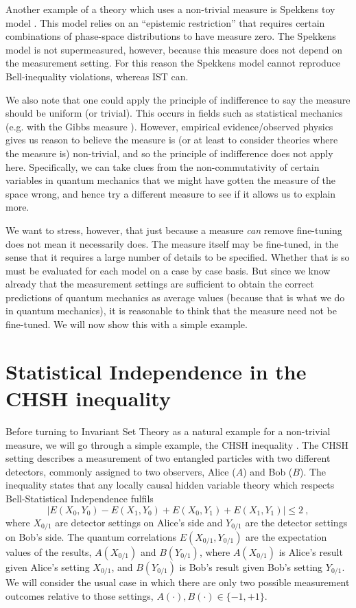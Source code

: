 \documentclass{article}
\begin{document}
Another example of a theory which uses a non-trivial measure is Spekkens toy model \mbox{\cite{Spekkens2007Evidence}}. This model relies on an ``epistemic restriction'' that requires certain combinations of phase-space distributions to have measure zero. The Spekkens model is not supermeasured, however, because this measure does not depend on the measurement setting. For this reason the Spekkens model cannot reproduce Bell-inequality violations, whereas {\sc IST} can.

We also note that one could apply the principle of indifference to say the measure should be uniform (or trivial). This occurs in fields such as statistical mechanics (e.g. with the Gibbs measure \mbox{\cite{georgii2011gibbs}}). However, empirical evidence/observed physics gives us reason to believe the measure is (or at least to consider theories where the measure is) non-trivial, and so the principle of indifference does not apply here. Specifically, we can take clues from the non-commutativity of certain variables in quantum mechanics that we might have gotten the measure of the space wrong, and hence try a different measure to see if it allows us to explain more.

We want to stress, however, that just because a measure \emph{can} remove fine-tuning does not mean it necessarily does. The measure itself may be fine-tuned, in the sense that it requires a large number of details to be specified. Whether that is so must be evaluated for each model on a case by case basis. But since we know already that the measurement settings are sufficient to obtain the correct predictions of quantum mechanics as average values (because that is what we do in quantum mechanics), it is reasonable to think that the measure need not be fine-tuned. We will now show this with a simple example.


\section{Statistical Independence in the CHSH inequality}
\label{CHSH}

Before turning to Invariant Set Theory as a natural example for a non-trivial measure, we will go through a simple example, the {\sc CHSH} inequality \cite{Clauser1969CHSH}.
The {\sc CHSH} setting describes a measurement of two entangled particles with two different detectors, commonly assigned to two observers, Alice ($A$) and Bob ($B$). The inequality states that any locally causal hidden variable theory which respects Bell-Statistical Independence fulfils
\begin{equation}
   \big| E(X_0,Y_0)-E(X_1,Y_0)+E(X_0,Y_1)+E(X_1,Y_1) \big| \leq 2~,
\end{equation}
where $X_{0/1}$ are detector settings on Alice's side and $Y_{0/1}$ are the detector settings on Bob's side. The quantum correlations $E(X_{0/1},Y_{0/1})$ are the expectation values of the results, $A(X_{0/1})$ and $B(Y_{0/1})$, where $A(X_{0/1})$ is Alice's result given Alice's setting $X_{0/1}$, and $B(Y_{0/1})$ is Bob's result given Bob's setting $Y_{0/1}$. 
We will consider the usual case in which there are only two possible measurement outcomes relative to those settings, $A(\cdot),B(\cdot) \in \{-1,+1 \}$.
\end{document}
